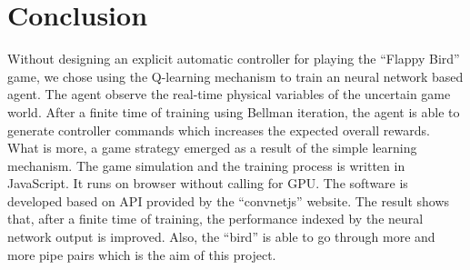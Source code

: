 \documentclass[conference,compsoc]{IEEEtran}
\begin{document}




\section{Conclusion}
Without designing an explicit automatic controller for playing the ``Flappy Bird'' game, we chose using the Q-learning mechanism to train an neural network based agent. The agent observe the real-time physical variables of the  uncertain game world. After a finite time of training using Bellman iteration, the agent is able to generate controller commands which increases the expected overall rewards. What is more, a game strategy emerged as a result of the simple learning mechanism. 
The game simulation and the training process is written in JavaScript. It runs on browser without calling for GPU. The software is developed based on API provided by the ``convnetjs'' website. 
The result shows that, after a finite time of training, the performance indexed by the neural network output is improved. Also, the ``bird'' is able to go through more and more pipe pairs which is the aim of this project.










\end{document}
